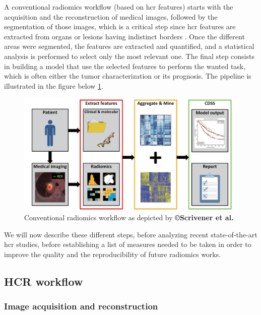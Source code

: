 A conventional radiomics workflow (based on \ac{hcr} features) starts
with the acquisition and the reconstruction of medical images, followed
by the segmentation of those images, which is a critical step since
\ac{hcr} features are extracted from organs or lesions having indistinct borders \cite{Gillies2016}. 
Once the different areas were segmented, the features are
extracted and quantified, and a statistical analysis is performed to
select only the most relevant one. The final step consists in building a
model that use the selected features to perform the wanted task,
which is often either the tumor characterization or its prognosis. The
pipeline is illustrated in the figure below \ref{Scrivener2016_Fig1}.


\begin{figure}[th!]
\centering
\includegraphics[width=0.7\linewidth]{images/image4_crop}
\caption{Conventional radiomics workflow as depicted by \textbf{©Scrivener et al.} \cite{Scrivener2016}}
\label{Scrivener2016_Fig1}
\end{figure}


We will now describe these different steps, before analyzing recent
state-of-the-art \ac{hcr} studies, before establishing a list of
measures needed to be taken in order to improve the quality and the
reproducibility of future radiomics works.

\subsection{HCR workflow}\label{hcr-workflow}

\subsubsection{Image acquisition and reconstruction}\label{image-acquisition-and-reconstruction}

